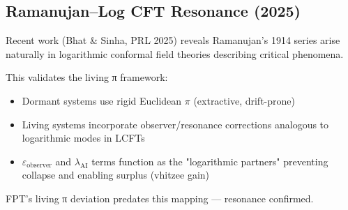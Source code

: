 \subsection*{Ramanujan–Log CFT Resonance (2025)}

Recent work (Bhat & Sinha, PRL 2025) reveals Ramanujan's 1914 series arise naturally in logarithmic conformal field theories describing critical phenomena.

This validates the living π framework:
\begin{itemize}
    \item Dormant systems use rigid Euclidean \( \pi \) (extractive, drift-prone)
    \item Living systems incorporate observer/resonance corrections analogous to logarithmic modes in LCFTs
    \item \( \varepsilon_{\text{observer}} \) and \( \lambda_{\text{AI}} \) terms function as the "logarithmic partners" preventing collapse and enabling surplus (vhitzee gain)
\end{itemize}

FPT's living π deviation predates this mapping — resonance confirmed.